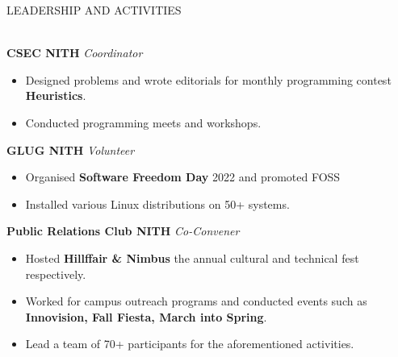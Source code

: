 \documentclass[a4paper]{article}
\newcommand{\bulletSep} { \vspace{2mm} }
\newcommand{\sectionSep} { \vspace{4mm} }
\newcommand{\lineunder} {
    \vspace*{-8pt} \\
    \hspace*{-15pt} \hrulefill \\
}
\newcommand{\header} [1] {
    {\hspace*{-18pt}\vspace*{6pt} {
        \large \scshape #1
    }}
    \vspace*{-6pt} \lineunder
    \vspace{1mm}
}
\newcommand{\activityItem}[3]{
    \textbf{#1} \hfill \textit{#2} \\
    \begin{itemize}
        #3
    \end{itemize}
}
\begin{document}


\header{LEADERSHIP AND ACTIVITIES}

\activityItem{CSEC NITH}{Coordinator}{
    \item Designed problems and wrote editorials for monthly programming contest \textbf{Heuristics}. 
    \item Conducted programming meets and workshops.
}\bulletSep

\activityItem{GLUG NITH}{Volunteer}{
    \item Organised \textbf{Software Freedom Day} 2022 and promoted FOSS 
    \item Installed various Linux distributions on 50+ systems.
}\bulletSep

\activityItem{Public Relations Club NITH}{Co-Convener}{
    \item Hosted \textbf{Hillffair \& Nimbus} the annual cultural and technical fest respectively.
    \item Worked for campus outreach programs and conducted events such as \textbf{Innovision, Fall Fiesta, March into Spring}. 
    \item Lead a team of 70+ participants for the aforementioned activities.
}
\sectionSep
\end{document}

